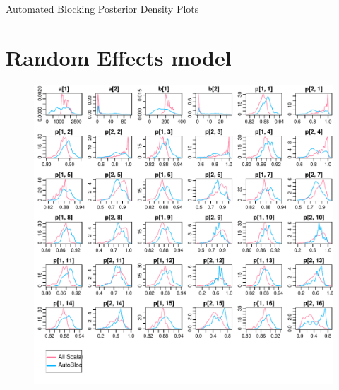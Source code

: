 \documentclass{article}
\begin{document}
{\LARGE Automated Blocking Posterior Density Plots}

\section{Random Effects model}
\begin{figure}[h]
\centerline{\includegraphics[scale=1.0]{RandomEffectsmodel}}
\end{figure}
\thispagestyle{empty}
\clearpage
\end{document}
